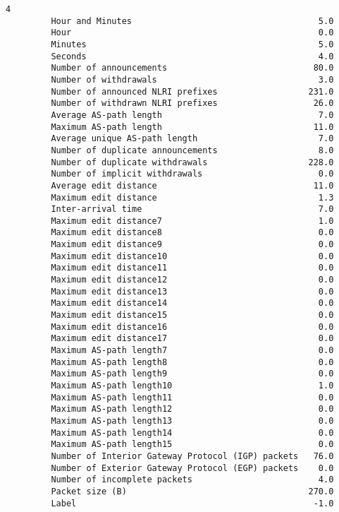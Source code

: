 \documentclass[11pt]{article}
\begin{document}
\begin{Verbatim}[commandchars=\\\{\}]
                                                                4  
         Hour and Minutes                                     5.0  
         Hour                                                 0.0  
         Minutes                                              5.0  
         Seconds                                              4.0  
         Number of announcements                             80.0  
         Number of withdrawals                                3.0  
         Number of announced NLRI prefixes                  231.0  
         Number of withdrawn NLRI prefixes                   26.0  
         Average AS-path length                               7.0  
         Maximum AS-path length                              11.0  
         Average unique AS-path length                        7.0  
         Number of duplicate announcements                    8.0  
         Number of duplicate withdrawals                    228.0  
         Number of implicit withdrawals                       0.0  
         Average edit distance                               11.0  
         Maximum edit distance                                1.3  
         Inter-arrival time                                   7.0  
         Maximum edit distance7                               1.0  
         Maximum edit distance8                               0.0  
         Maximum edit distance9                               0.0  
         Maximum edit distance10                              0.0  
         Maximum edit distance11                              0.0  
         Maximum edit distance12                              0.0  
         Maximum edit distance13                              0.0  
         Maximum edit distance14                              0.0  
         Maximum edit distance15                              0.0  
         Maximum edit distance16                              0.0  
         Maximum edit distance17                              0.0  
         Maximum AS-path length7                              0.0  
         Maximum AS-path length8                              0.0  
         Maximum AS-path length9                              0.0  
         Maximum AS-path length10                             1.0  
         Maximum AS-path length11                             0.0  
         Maximum AS-path length12                             0.0  
         Maximum AS-path length13                             0.0  
         Maximum AS-path length14                             0.0  
         Maximum AS-path length15                             0.0  
         Number of Interior Gateway Protocol (IGP) packets   76.0  
         Number of Exterior Gateway Protocol (EGP) packets    0.0  
         Number of incomplete packets                         4.0  
         Packet size (B)                                    270.0  
         Label                                               -1.0  
\end{Verbatim}
            
\end{document}
